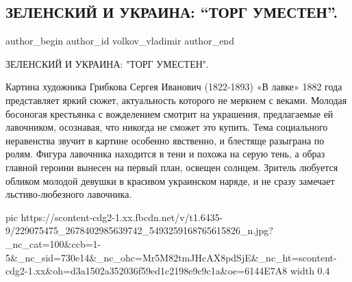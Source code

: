  
 
 
 
 
 
\subsection{ЗЕЛЕНСКИЙ И УКРАИНА: \enquote{ТОРГ УМЕСТЕН}.}
\label{sec:02_08_2021.fb.volkov_vladimir.1.zelenskii_torg_umesten_kartina}
 
\ifcmt
 author_begin
   author_id volkov_vladimir
 author_end
\fi

ЗЕЛЕНСКИЙ И УКРАИНА: "ТОРГ УМЕСТЕН".

Картина художника Грибкова Сергея Иванович (1822-1893) «В лавке» 1882 года
представляет яркий сюжет, актуальность которого не меркнем с веками. Молодая
босоногая крестьянка с вожделением смотрит на украшения, предлагаемые ей
лавочником, осознавая, что никогда не сможет это купить. Тема социального
неравенства звучит в картине особенно явственно, и блестяще разыграна по ролям.
Фигура лавочника находится в тени и похожа на серую тень, а образ главной
героини вынесен на первый план, освещен солнцем. Зритель любуется обликом
молодой девушки в красивом украинском наряде, и не сразу замечает
льстиво-любезного лавочника.

\ifcmt
  pic https://scontent-cdg2-1.xx.fbcdn.net/v/t1.6435-9/229075475_2678402985639742_5493259168765615826_n.jpg?_nc_cat=100&ccb=1-5&_nc_sid=730e14&_nc_ohc=Mr5M82tmJHcAX8pdSjE&_nc_ht=scontent-cdg2-1.xx&oh=d3a1502a352036f59ed1c2198e9c9c1a&oe=6144E7A8
  width 0.4
\fi

